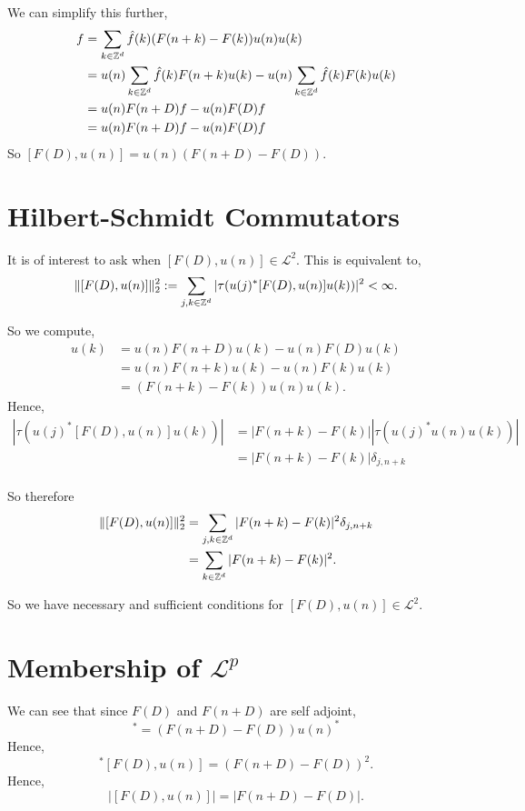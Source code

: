 We can simplify this further,
\begin{align}
    [F(D),u(n)]f &= \sum_{k \in \Itgr^d} \hat{f}(k) (F(n+k)-F(k))u(n)u(k)\\
                 &= u(n)\sum_{k \in \Itgr^d}  \hat{f}(k) F(n+k)u(k) - u(n) \sum_{k \in \Itgr^d} \hat{f}(k)F(k)u(k)\\
                 &= u(n) F(n+D)f - u(n)F(D)f\\
                 \label{commutatorFormula}
                 &= u(n)F(n+D)f - u(n)F(D)f
\end{align}
So $[F(D),u(n)] = u(n)(F(n+D)-F(D))$. 

\section{Hilbert-Schmidt Commutators}
It is of interest to ask when $[F(D),u(n)] \in \mathcal{L}^2$. This is equivalent to,
\begin{equation}
    \|[F(D),u(n)]\|_{2}^2 := \sum_{j,k \in \mathbb{Z}^d} |\tau(u(j)^* [F(D),u(n)]u(k))|^2 < \infty.
\end{equation}

So we compute,
\begin{align}
    [F(D),u(n)]u(k) &= u(n)F(n+D)u(k) - u(n)F(D)u(k)\\
                    &= u(n)F(n+k)u(k) - u(n)F(k)u(k)\\
                    &= (F(n+k)-F(k))u(n)u(k).
\end{align}
Hence,
\begin{align}
    |\tau(u(j)^*[F(D),u(n)]u(k))| &= |F(n+k)-F(k)||\tau(u(j)^*u(n)u(k))|\\
                                  &= |F(n+k)-F(k)|\delta_{j,n+k}\\
\end{align}

So therefore
\begin{align}
    \|[F(D),u(n)]\|_{2}^2 &= \sum_{j,k \in \mathbb{Z}^d} |F(n+k)-F(k)|^2 \delta_{j,n+k}\\
                          &= \sum_{k \in \mathbb{Z}^d} |F(n+k)-F(k)|^2.
\end{align}

So we have necessary and sufficient conditions for $[F(D),u(n)] \in \mathcal{L}^2$. 

\section{Membership of $\mathcal{L}^p$}
We can see that since $F(D)$ and $F(n+D)$ are self adjoint, 
\begin{equation}
    [F(D),u(n)]^* = (F(n+D)-F(D))u(n)^*
\end{equation}
Hence,
\begin{equation}
    [F(D),u(n)]^*[F(D),u(n)] = (F(n+D)-F(D))^2.
\end{equation}
Hence,
\begin{equation}
    |[F(D),u(n)]| = |F(n+D)-F(D)|.
\end{equation}

